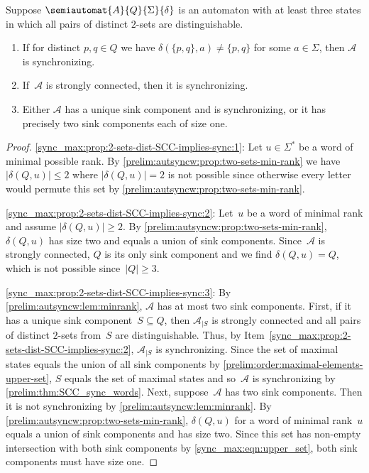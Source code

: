 \begin{corollary} \label{prelim:aut-sync-words:subset:cor:no-letter-fixes-two-sets-and-dist-2-sets-implies-sync} \label{sync_max:prop:2-sets-dist-SCC-implies-sync}
Suppose $\semiautomat{A}{Q}{\Sigma}{\delta}$ is an automaton with at least three states in which all pairs of distinct $2$-sets
are distinguishable.
\begin{enumerate}
\item \label{sync_max:prop:2-sets-dist-SCC-implies-sync:1} If for distinct $p,q \in Q$ 
we have $\delta(\{p,q\}, a) \ne \{p,q\}$ for some $a \in \Sigma$,
then $\mathcal A$ is synchronizing.

\item \label{sync_max:prop:2-sets-dist-SCC-implies-sync:2} If~$\mathcal A$ is strongly connected, then it is synchronizing.

\item \label{sync_max:prop:2-sets-dist-SCC-implies-sync:3} Either $\mathcal A$ has a unique sink component and is synchronizing, or it has 
precisely two sink components each of size one.
\end{enumerate}
\end{corollary}
\begin{proof}
\ref{sync_max:prop:2-sets-dist-SCC-implies-sync:1}: Let $u \in \Sigma^*$ be a word of minimal possible rank.
By \cref{prelim:autsyncw:prop:two-sets-min-rank} 
we have $|\delta(Q, u)| \le 2$
where $|\delta(Q, u)| = 2$ is not possible
since otherwise every letter would permute this set
by \cref{prelim:autsyncw:prop:two-sets-min-rank}.

\ref{sync_max:prop:2-sets-dist-SCC-implies-sync:2}: Let~$u$ be a word of minimal rank
and assume $|\delta(Q, u)| \ge 2$.
By \cref{prelim:autsyncw:prop:two-sets-min-rank},
$\delta(Q, u)$ has size two and equals a union of sink components.
Since~$\mathcal A$ is strongly connected, $Q$ is its only sink component
and  we find $\delta(Q, u) = Q$,
which is not possible since~$|Q| \ge 3$.

\ref{sync_max:prop:2-sets-dist-SCC-implies-sync:3}:	By \cref{prelim:autsyncw:lem:minrank}, $\mathcal A$
has at most two sink components.
First, if it has a unique sink component~$S \subseteq Q$,
then $\mathcal A_{|S}$ is strongly connected
and all pairs of distinct $2$-sets from~$S$ are distinguishable.
Thus, by Item~\ref{sync_max:prop:2-sets-dist-SCC-implies-sync:2}, $\mathcal A_{|S}$ is synchronizing.
Since the set of maximal states equals the union of all sink components
by \cref{prelim:order:maximal-elements-upper-set}, $S$ equals the set of maximal states
and so~$\mathcal A$ is synchronizing by \cref{prelim:thm:SCC_sync_words}.
Next, suppose~$\mathcal A$ has two sink components.
Then it is not synchronizing by \cref{prelim:autsyncw:lem:minrank}.
By \cref{prelim:autsyncw:prop:two-sets-min-rank},
$\delta(Q, u)$ for a word of minimal rank~$u$
equals a union of sink components and has size two.
Since this set has non-empty intersection with both sink components by \cref{sync_max:eqn:upper_set}, 
both sink components must have size one.
\end{proof}

